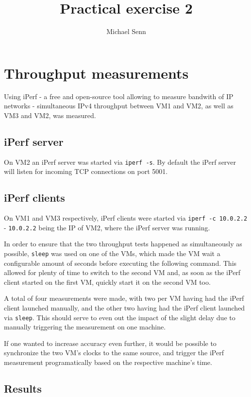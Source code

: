 \documentclass[a4paper]{scrreprt}
\title{Practical exercise 2}
\author{Michael Senn \maillink{michael.senn@students.unibe.ch}}
\date{\printdate}
\begin{document}
\maketitle


\chapter{Throughput measurements}

Using iPerf - a free and open-source tool allowing to measure bandwith of IP
networks - simultaneous IPv4 throughput between VM1 and VM2, as well as VM3 and
VM2, was measured.

\section{iPerf server}

On VM2 an iPerf server was started via \texttt{iperf -s}. By default the iPerf
server will listen for incoming TCP connections on port 5001.

\section{iPerf clients}

On VM1 and VM3 respectively, iPerf clients were started via \texttt{iperf -c
10.0.2.2} - \texttt{10.0.2.2} being the IP of VM2, where the iPerf server was
running.

In order to ensure that the two throughput tests happened as simultaneously as
possible, \texttt{sleep} was used on one of the VMs, which made the VM wait a
configurable amount of seconds before executing the following command. This
allowed for plenty of time to switch to the second VM and, as soon as the iPerf
client started on the first VM, quickly start it on the second VM too.

A total of four measurements were made, with two per VM having had the iPerf
client launched manually, and the other two having had the iPerf client
launched via \texttt{sleep}. This should serve to even out the impact of the
slight delay due to manually triggering the measurement on one machine.

If one wanted to increase accuracy even further, it would be possible to
synchronize the two VM's clocks to the same source, and trigger the iPerf
measurement programatically based on the respective machine's time.

\section{Results}
\end{document}
